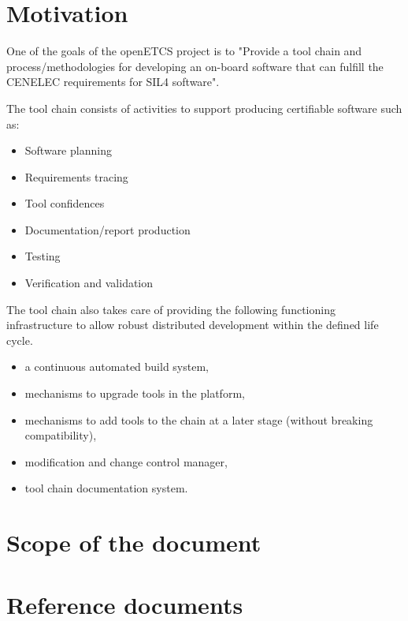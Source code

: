 

\section{Motivation}
One of the goals of the openETCS project is to "Provide a tool chain and process/methodologies for developing an on-board software that can fulfill the CENELEC requirements for SIL4 software".

The tool chain consists of activities to support producing certifiable software such as:
\begin{itemize}
\item Software planning           
\item Requirements tracing
\item Tool confidences
\item Documentation/report production
\item Testing
\item  Verification and validation
\end{itemize}
The tool chain also takes care of providing the following functioning infrastructure to allow robust distributed development within the defined life cycle.
\begin{itemize}
\item a continuous automated build system,
\item mechanisms to upgrade tools in the platform,
\item mechanisms to add tools to the chain at a later stage (without breaking compatibility),
\item modification and change control manager,
\item tool chain documentation system.
\end{itemize}
\section{Scope of the document}

 \section{Reference documents}
\begingroup
\renewcommand{\chapter}[2]{}%
  
  
\endgroup

